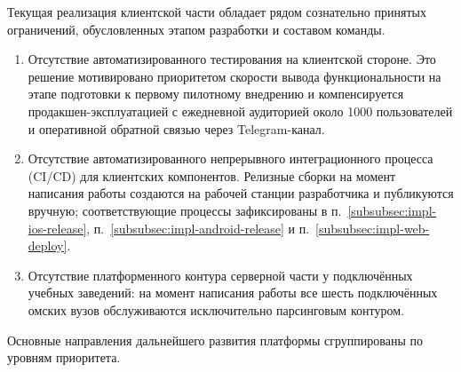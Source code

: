 Текущая реализация клиентской части обладает рядом сознательно принятых ограничений, обусловленных этапом разработки и составом команды.

\begin{enumerate}
  \item Отсутствие автоматизированного тестирования на клиентской стороне. Это решение мотивировано приоритетом скорости вывода функциональности на этапе подготовки к первому пилотному внедрению и компенсируется продакшен-эксплуатацией с ежедневной аудиторией около 1000 пользователей и оперативной обратной связью через Telegram-канал.
  \item Отсутствие автоматизированного непрерывного интеграционного процесса (CI/CD) для клиентских компонентов. Релизные сборки на момент написания работы создаются на рабочей станции разработчика и публикуются вручную; соответствующие процессы зафиксированы в п.~\ref{subsubsec:impl-ios-release}, п.~\ref{subsubsec:impl-android-release} и п.~\ref{subsubsec:impl-web-deploy}.
  \item Отсутствие платформенного контура серверной части у подключённых учебных заведений: на момент написания работы все шесть подключённых омских вузов обслуживаются исключительно парсинговым контуром.
\end{enumerate}

Основные направления дальнейшего развития платформы сгруппированы по уровням приоритета.

